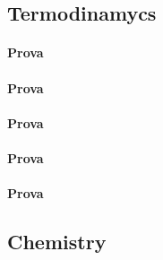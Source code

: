 \documentclass[a4paper]{report}
\begin{document}
\section{Termodinamycs}
\begin{multicols}{2}

\subsubsection{Prova}
\subsubsection{Prova}
\subsubsection{Prova}
\subsubsection{Prova}
\subsubsection{Prova}
\end{multicols}

\begin{center}
    \chapter{Chemistry}
\end{center}
\end{document}
